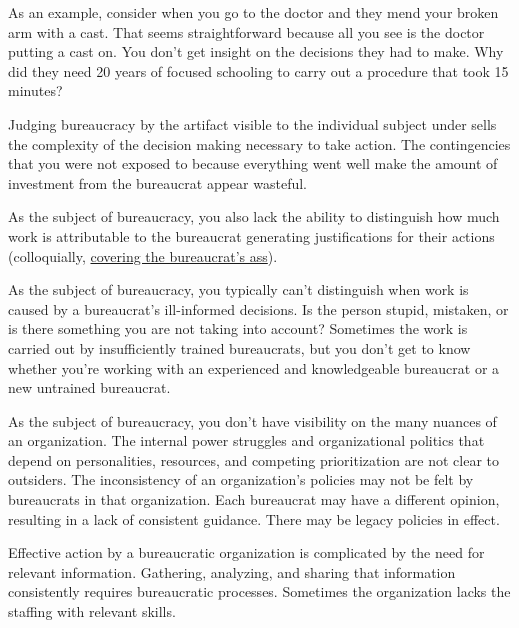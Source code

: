 As an example, consider when you go to the doctor and they mend your broken arm with a cast. That seems straightforward because all you see is the doctor putting a cast on. You don't get insight on the decisions they had to make. Why did they need 20 years of focused schooling to carry out a procedure that took 15 minutes?

Judging bureaucracy by the artifact visible to the individual subject under sells the complexity of the decision making necessary to take action. The contingencies that you were not exposed to because everything went well make the amount of investment from the bureaucrat appear wasteful.

As the subject of bureaucracy, you also lack the ability to distinguish how much work is attributable to the bureaucrat generating justifications for their actions (colloquially, \href{https://en.wikipedia.org/wiki/Cover_your_ass}{covering the bureaucrat's ass}). 

As the subject of bureaucracy, you typically can't distinguish when work is caused by a bureaucrat's ill-informed decisions. Is the person stupid, mistaken, or is there something you are not taking into account?
Sometimes the work is carried out by insufficiently trained bureaucrats, but you don't get to know whether you're working with an experienced and knowledgeable bureaucrat or a new untrained bureaucrat. 

As the subject of bureaucracy, you don't have visibility on the many nuances of an organization. The internal power struggles and organizational politics that depend on personalities, resources, and competing prioritization are not clear to outsiders.
The inconsistency of an organization's policies may not be felt by bureaucrats in that organization. Each bureaucrat may have a different opinion, resulting in a lack of consistent guidance.
There may be legacy policies in effect.

Effective action by a bureaucratic organization is complicated by the need for relevant information. Gathering, analyzing, and sharing that information consistently requires bureaucratic processes. Sometimes the organization lacks the staffing with relevant skills. 




